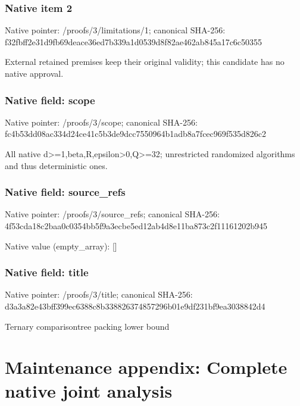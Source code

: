 \documentclass[10pt,a4paper]{article}
\begin{document}
\subsubsection{Native item 2}


Native pointer: /proofs/3/limitations/1; canonical SHA-256: f32fbff2e31d9fb69deace36\allowbreak{}ed7b339a1d0539d8f82ae462\allowbreak{}ab845a17c6c50355


External retained premises keep their original validity; this candidate has no native approval.


\subsubsection{Native field: scope}


Native pointer: /proofs/3/scope; canonical SHA-256: fc4b53dd08ac334d24ce41c5\allowbreak{}b3de9dcc7550964b1adb8a7f\allowbreak{}cec969f535d826c2


All native d>=1,beta,R,epsilon>0,Q>=32; unrestricted randomized algorithms and thus deterministic ones.


\subsubsection{Native field: source\_refs}


Native pointer: /proofs/3/source\_refs; canonical SHA-256: 4f53cda18c2baa0c0354bb5f\allowbreak{}9a3ecbe5ed12ab4d8e11ba87\allowbreak{}3c2f11161202b945



Native value (empty\_array): []



\subsubsection{Native field: title}


Native pointer: /proofs/3/title; canonical SHA-256: d3a3a82e43bff399ec6388c8\allowbreak{}b338826374857296b01e9df2\allowbreak{}31bf9ea3038842d4


Ternary comparisontree packing lower bound


\section{Maintenance appendix: Complete native joint analysis}
\end{document}
